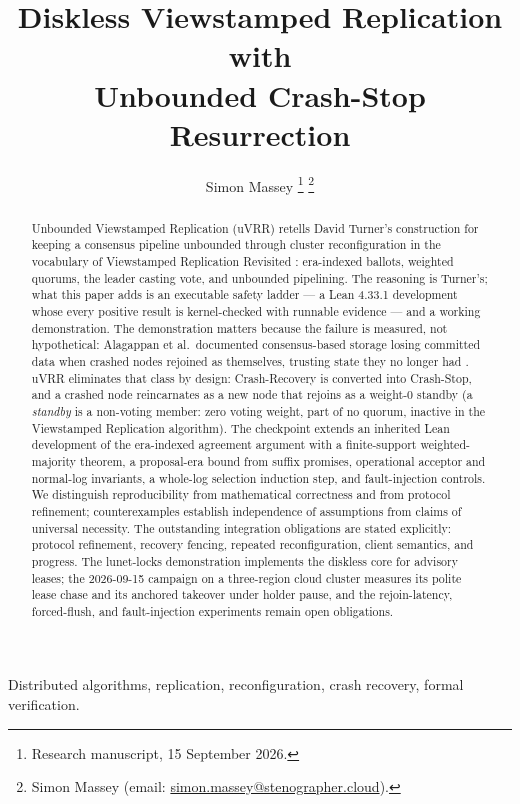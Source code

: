 \documentclass[10pt,journal,letterpaper]{IEEEtran}
\title{Diskless Viewstamped Replication with\\Unbounded Crash-Stop Resurrection}
\author{Simon Massey%
\thanks{Research manuscript, 15 September 2026.}%
\thanks{Simon Massey (email: \href{mailto:simon.massey@stenographer.cloud}{simon.massey@stenographer.cloud}).}}
\date{}
\begin{document}
\maketitle
\thispagestyle{uvrrfirst}
\begin{abstract}
Unbounded Viewstamped Replication (uVRR) retells David Turner's construction
for keeping a consensus pipeline unbounded through cluster reconfiguration
\cite{turner} in the vocabulary of Viewstamped Replication Revisited
\cite{vrr}: era-indexed ballots, weighted quorums, the leader casting vote,
and unbounded pipelining. The reasoning is Turner's; what this paper adds is
an executable safety ladder --- a Lean 4.33.1 development whose every positive
result is kernel-checked with runnable evidence --- and a working
demonstration. The demonstration matters because the failure is measured,
not hypothetical: Alagappan et al.\ documented consensus-based storage
losing committed data when crashed nodes rejoined as themselves, trusting
state they no longer had
\cite{alagappan2018}. uVRR eliminates that class by design: Crash-Recovery is
converted into Crash-Stop, and a crashed node reincarnates as a new node that
rejoins as a weight-0 standby (a \emph{standby} is a non-voting member: zero
voting weight, part of no quorum, inactive in the Viewstamped Replication
algorithm). The checkpoint extends an inherited Lean development of the
era-indexed agreement argument with a finite-support weighted-majority
theorem, a proposal-era bound from suffix promises, operational acceptor and
normal-log invariants, a whole-log selection induction step, and
fault-injection controls. We distinguish reproducibility from mathematical
correctness and from protocol refinement; counterexamples establish
independence of assumptions from claims of universal necessity. The
outstanding integration obligations are stated explicitly: protocol
refinement, recovery fencing, repeated reconfiguration, client semantics,
and progress. The lunet-locks demonstration implements the diskless core for
advisory leases; the 2026-09-15 campaign on a three-region cloud cluster
measures its polite lease chase and its anchored takeover under holder pause,
and the rejoin-latency, forced-flush, and fault-injection experiments remain
open obligations.
\end{abstract}
\begin{IEEEkeywords}
Distributed algorithms, replication, reconfiguration, crash recovery, formal verification.
\end{IEEEkeywords}
\end{document}
